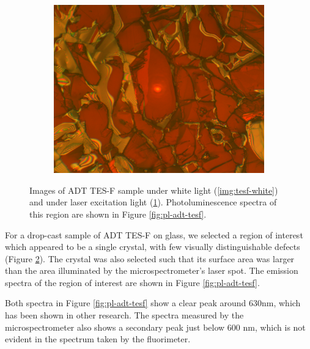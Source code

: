 \begin{figure}[h]
\begin{subfigure}[b]{0.45\textwidth}
        \includegraphics[width=\textwidth]{./img/tesf-laser-illum.png}
        \caption{}
        \label{img:tesf-laser}
    \end{subfigure}
    \caption{Images of ADT TES-F sample under white light (\ref{img:tesf-white}) and under laser excitation light (\ref{img:tesf-laser}). Photoluminescence spectra of this region are shown in Figure \ref{fig:pl-adt-tesf}.}
    \label{img:tesf}
\end{figure}

For a drop-cast sample of ADT TES-F on glass, we selected a region of interest which appeared to be a single crystal, with few visually distinguishable defects (Figure \ref{img:tesf}). The crystal was also selected such that its surface area was larger than the area illuminated by the microspectrometer's laser spot. The emission spectra of the region of interest are shown in Figure \ref{fig:pl-adt-tesf}.


Both spectra in Figure \ref{fig:pl-adt-tesf} show a clear peak around 630nm, which has been shown in other research.\cite{lam_polarization_2018}\cite{ostroverkhova_organic_2016}\cite{platt_optical_2009} The spectra measured by the microspectrometer also shows a secondary peak just below 600 nm, which is not evident in the spectrum taken by the fluorimeter. 

